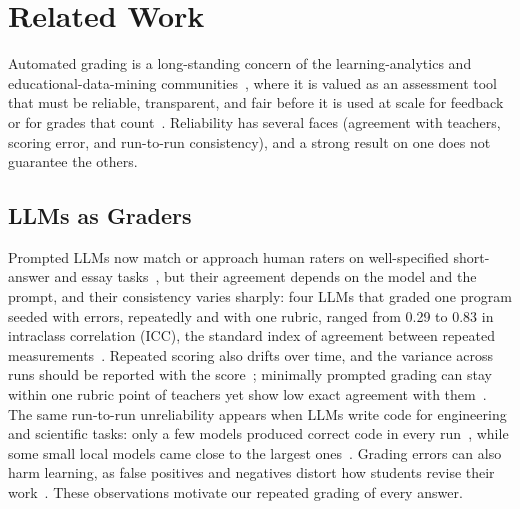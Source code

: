 
\section{Related Work}
\label{sec:related}

Automated grading is a long-standing concern of the learning-analytics and educational-data-mining
communities~\cite{putnikovic_embeddings_2023,ferreira_mello_automatic_2025}, where it is valued as an assessment
tool that must be reliable, transparent, and fair before it is used at scale for feedback or for grades that
count~\cite{arz_von_straussenburg_enabling_2025,li_am_2023}. Reliability has several faces (agreement with
teachers, scoring error, and run-to-run consistency), and a strong result on one does not guarantee the others.

\subsection{LLMs as Graders}
Prompted LLMs now match or approach human raters on well-specified short-answer and essay
tasks~\cite{aminah_evaluating_2025,sessler_canai_2025,henkel_roars_2025}, but their agreement depends on the model
and the prompt, and their consistency varies sharply: four LLMs that graded one program seeded with errors,
repeatedly and with one rubric, ranged from 0.29 to 0.83 in intraclass correlation (ICC), the standard index of
agreement between repeated measurements~\cite{moazzez_assessing_2024}. Repeated scoring also drifts over time,
and the variance across runs should be reported with the score~\cite{pack_large_2024}; minimally prompted
grading can stay within one rubric point of teachers yet show low exact agreement with
them~\cite{tate_can_2024}. The same run-to-run unreliability appears when LLMs write code for engineering and
scientific tasks: only a few models produced correct code in every run~\cite{fachada_gpt41_2025,fachada_abm_2026},
while some small local models came close to the largest ones~\cite{fernandes_lorawan_2025}. Grading errors can
also harm learning, as false positives and negatives distort how students revise their work~\cite{li_am_2023}.
These observations motivate our repeated grading of every answer.

